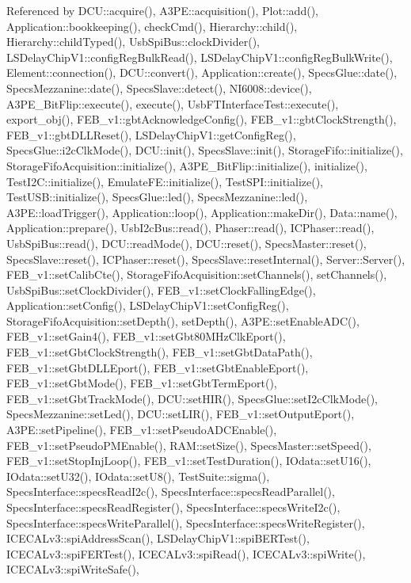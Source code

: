 Referenced by D\+C\+U\+::acquire(), A3\+P\+E\+::acquisition(), Plot\+::add(), Application\+::bookkeeping(), check\+Cmd(), Hierarchy\+::child(), Hierarchy\+::child\+Typed(), Usb\+Spi\+Bus\+::clock\+Divider(), L\+S\+Delay\+Chip\+V1\+::config\+Reg\+Bulk\+Read(), L\+S\+Delay\+Chip\+V1\+::config\+Reg\+Bulk\+Write(), Element\+::connection(), D\+C\+U\+::convert(), Application\+::create(), Specs\+Glue\+::date(), Specs\+Mezzanine\+::date(), Specs\+Slave\+::detect(), N\+I6008\+::device(), A3\+P\+E\+\_\+\+Bit\+Flip\+::execute(), execute(), Usb\+F\+T\+Interface\+Test\+::execute(), export\+\_\+obj(), F\+E\+B\+\_\+v1\+::gbt\+Acknowledge\+Config(), F\+E\+B\+\_\+v1\+::gbt\+Clock\+Strength(), F\+E\+B\+\_\+v1\+::gbt\+D\+L\+L\+Reset(), L\+S\+Delay\+Chip\+V1\+::get\+Config\+Reg(), Specs\+Glue\+::i2c\+Clk\+Mode(), D\+C\+U\+::init(), Specs\+Slave\+::init(), Storage\+Fifo\+::initialize(), Storage\+Fifo\+Acquisition\+::initialize(), A3\+P\+E\+\_\+\+Bit\+Flip\+::initialize(), initialize(), Test\+I2\+C\+::initialize(), Emulate\+F\+E\+::initialize(), Test\+S\+P\+I\+::initialize(), Test\+U\+S\+B\+::initialize(), Specs\+Glue\+::led(), Specs\+Mezzanine\+::led(), A3\+P\+E\+::load\+Trigger(), Application\+::loop(), Application\+::make\+Dir(), Data\+::name(), Application\+::prepare(), Usb\+I2c\+Bus\+::read(), Phaser\+::read(), I\+C\+Phaser\+::read(), Usb\+Spi\+Bus\+::read(), D\+C\+U\+::read\+Mode(), D\+C\+U\+::reset(), Specs\+Master\+::reset(), Specs\+Slave\+::reset(), I\+C\+Phaser\+::reset(), Specs\+Slave\+::reset\+Internal(), Server\+::\+Server(), F\+E\+B\+\_\+v1\+::set\+Calib\+Cte(), Storage\+Fifo\+Acquisition\+::set\+Channels(), set\+Channels(), Usb\+Spi\+Bus\+::set\+Clock\+Divider(), F\+E\+B\+\_\+v1\+::set\+Clock\+Falling\+Edge(), Application\+::set\+Config(), L\+S\+Delay\+Chip\+V1\+::set\+Config\+Reg(), Storage\+Fifo\+Acquisition\+::set\+Depth(), set\+Depth(), A3\+P\+E\+::set\+Enable\+A\+D\+C(), F\+E\+B\+\_\+v1\+::set\+Gain4(), F\+E\+B\+\_\+v1\+::set\+Gbt80\+M\+Hz\+Clk\+Eport(), F\+E\+B\+\_\+v1\+::set\+Gbt\+Clock\+Strength(), F\+E\+B\+\_\+v1\+::set\+Gbt\+Data\+Path(), F\+E\+B\+\_\+v1\+::set\+Gbt\+D\+L\+L\+Eport(), F\+E\+B\+\_\+v1\+::set\+Gbt\+Enable\+Eport(), F\+E\+B\+\_\+v1\+::set\+Gbt\+Mode(), F\+E\+B\+\_\+v1\+::set\+Gbt\+Term\+Eport(), F\+E\+B\+\_\+v1\+::set\+Gbt\+Track\+Mode(), D\+C\+U\+::set\+H\+I\+R(), Specs\+Glue\+::set\+I2c\+Clk\+Mode(), Specs\+Mezzanine\+::set\+Led(), D\+C\+U\+::set\+L\+I\+R(), F\+E\+B\+\_\+v1\+::set\+Output\+Eport(), A3\+P\+E\+::set\+Pipeline(), F\+E\+B\+\_\+v1\+::set\+Pseudo\+A\+D\+C\+Enable(), F\+E\+B\+\_\+v1\+::set\+Pseudo\+P\+M\+Enable(), R\+A\+M\+::set\+Size(), Specs\+Master\+::set\+Speed(), F\+E\+B\+\_\+v1\+::set\+Stop\+Inj\+Loop(), F\+E\+B\+\_\+v1\+::set\+Test\+Duration(), I\+Odata\+::set\+U16(), I\+Odata\+::set\+U32(), I\+Odata\+::set\+U8(), Test\+Suite\+::sigma(), Specs\+Interface\+::specs\+Read\+I2c(), Specs\+Interface\+::specs\+Read\+Parallel(), Specs\+Interface\+::specs\+Read\+Register(), Specs\+Interface\+::specs\+Write\+I2c(), Specs\+Interface\+::specs\+Write\+Parallel(), Specs\+Interface\+::specs\+Write\+Register(), I\+C\+E\+C\+A\+Lv3\+::spi\+Address\+Scan(), L\+S\+Delay\+Chip\+V1\+::spi\+B\+E\+R\+Test(), I\+C\+E\+C\+A\+Lv3\+::spi\+F\+E\+R\+Test(), I\+C\+E\+C\+A\+Lv3\+::spi\+Read(), I\+C\+E\+C\+A\+Lv3\+::spi\+Write(), I\+C\+E\+C\+A\+Lv3\+::spi\+Write\+Safe(), 